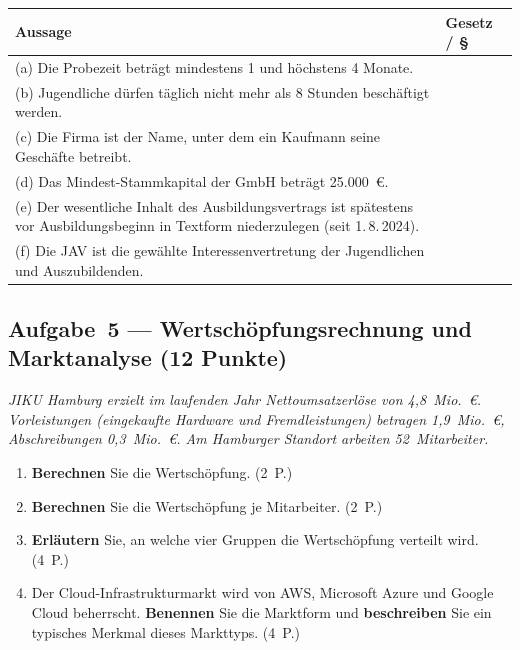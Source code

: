 \documentclass[11pt, a4paper]{article}
\begin{document}
\noindent
\begin{tabular}{|p{9.5cm}|p{3.5cm}|}
\hline
\textbf{Aussage} & \textbf{Gesetz / §}\\
\hline
(a) Die Probezeit beträgt mindestens 1 und höchstens 4 Monate. & \\[0.7cm]
\hline
(b) Jugendliche dürfen täglich nicht mehr als 8 Stunden beschäftigt werden. & \\[0.7cm]
\hline
(c) Die Firma ist der Name, unter dem ein Kaufmann seine Geschäfte betreibt. & \\[0.7cm]
\hline
(d) Das Mindest-Stammkapital der GmbH beträgt 25.000~€. & \\[0.7cm]
\hline
(e) Der wesentliche Inhalt des Ausbildungsvertrags ist spätestens vor Ausbildungsbeginn in Textform niederzulegen (seit 1.\,8.\,2024). & \\[0.7cm]
\hline
(f) Die JAV ist die gewählte Interessenvertretung der Jugendlichen und Auszubildenden. & \\[0.7cm]
\hline
\end{tabular}

\subsection*{Aufgabe~5 --- Wertschöpfungsrechnung und Marktanalyse (12 Punkte)}

\textit{JIKU Hamburg erzielt im laufenden Jahr Nettoumsatzerlöse von 4,8~Mio.~€.
Vorleistungen (eingekaufte Hardware und Fremdleistungen) betragen 1,9~Mio.~€,
Abschreibungen 0,3~Mio.~€. Am Hamburger Standort arbeiten 52~Mitarbeiter.}

\begin{enumerate}[label=(\alph*)]
  \item \textbf{Berechnen} Sie die Wertschöpfung. \hfill (2~P.)

  \vspace{3.5cm}

  \item \textbf{Berechnen} Sie die Wertschöpfung je Mitarbeiter. \hfill (2~P.)

  \vspace{3cm}

  \item \textbf{Erläutern} Sie, an welche vier Gruppen die Wertschöpfung verteilt wird. \hfill (4~P.)

  \vspace{5cm}

  \item Der Cloud-Infrastrukturmarkt wird von AWS, Microsoft Azure und Google Cloud beherrscht.
  \textbf{Benennen} Sie die Marktform und \textbf{beschreiben} Sie ein typisches Merkmal
  dieses Markttyps. \hfill (4~P.)

  \vspace{5cm}
\end{enumerate}
\end{document}
